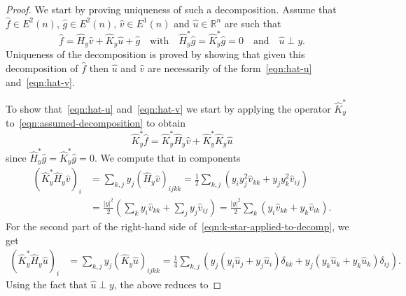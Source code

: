 \documentclass[11pt]{article}
\newcommand{\abs}[1]{\lvert #1 \rvert}
\begin{document}
\begin{proof}
We start by proving uniqueness of such a decomposition. Assume that $\widehat{f} \in E^2(n)$, $ \widehat g \in E^2(n)$, $\widehat v \in E^1(n)$ and $\widehat u \in \mathbb{R}^n$ are such that
\begin{equation}
\label{eqn:assumed-decomposition}
\widehat f
=
\widehat{H}_y\widehat v
+
\widehat{K}_y\widehat u
+
\widehat g
\quad\text{with}\quad
\widehat{H}^*_y\widehat g
=
\widehat{K}^*_y\widehat g
=
0
\quad\text{and}\quad
\widehat u \perp y.
\end{equation}
Uniqueness of the decomposition is proved by showing that given this decomposition of $\widehat f$ then $\widehat u$ and $\widehat v$ are necessarily of the form~\eqref{eqn:hat-u} and~\eqref{eqn:hat-v}.

To show that~\eqref{eqn:hat-u} and~\eqref{eqn:hat-v} we start by applying the operator $\widehat{K}^*_y$ to~\eqref{eqn:assumed-decomposition} to obtain
\begin{equation}
\label{eqn:k-star-applied-to-decomp}
\widehat{K}^*_y\widehat f
=
\widehat{K}^*_y\widehat{H}_y\widehat v
+
\widehat{K}^*_y\widehat{K}_y\widehat u
\end{equation}
since $\widehat{H}^*_y\widehat g = \widehat{K}^*_y\widehat g = 0$. We compute that in components
\begin{equation}
\label{eqn:k-star-f-decomp-part-1}
\begin{split}
(\widehat{K}^*_y\widehat{H}_y\widehat v)_i
&=
\sum_{k,j}
y_j(\widehat{H}_y\widehat v)_{ijkk}=
\frac{1}{2}
\sum_{k,j}
\left(
y_iy_j^2\widehat v_{kk}
+
y_jy_k^2\widehat v_{ij}
\right)
\\
&=
\frac{\abs{y}^2}{2}
\left(
\sum_{k}
y_i\widehat v_{kk}
+
\sum_{j}
y_j\widehat v_{ij}
\right)=
\frac{\abs{y}^2}{2}
\sum_{k}
\left(
y_i\widehat v_{kk}
+
y_k\widehat v_{ik}
\right).
\end{split}
\end{equation}
For the second part of the right-hand side of~\eqref{eqn:k-star-applied-to-decomp}, we get
\begin{equation}
\begin{split}
(\widehat{K}^*_y\widehat{H}_y\widehat u)_i
&=
\sum_{k,j}
y_j(\widehat{K}_y\widehat u)_{ijkk}=
\frac{1}{4}
\sum_{k,j}
\left(
y_j(y_i\widehat u_j + y_j\widehat u_i)\delta_{kk}
+
y_j(y_k\widehat u_k+y_k\widehat u_k)\delta_{ij}
\right).
\end{split}
\end{equation}
Using the fact that $\widehat u \perp y$, the above reduces to

\end{proof}
\end{document}
